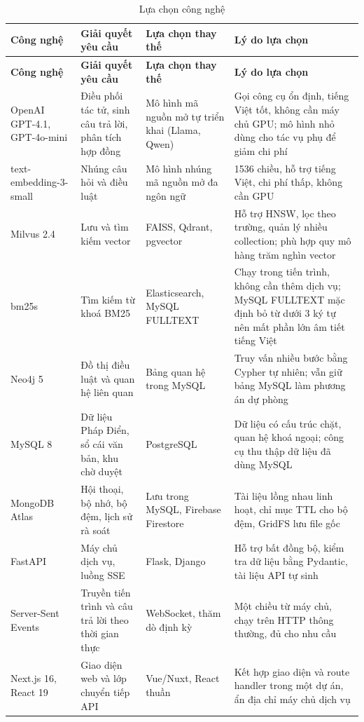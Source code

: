 \documentclass[../DoAn.tex]{subfiles}
\begin{document}
\begin{longtable}{|L{2.3cm}|L{3.1cm}|L{3.0cm}|L{4.9cm}|}
\caption{Lựa chọn công nghệ}\label{tab:congnghe}\\
\hline
\textbf{Công nghệ} & \textbf{Giải quyết yêu cầu} & \textbf{Lựa chọn thay thế} & \textbf{Lý do lựa chọn} \\ \hline
\endfirsthead
\hline
\textbf{Công nghệ} & \textbf{Giải quyết yêu cầu} & \textbf{Lựa chọn thay thế} & \textbf{Lý do lựa chọn} \\ \hline
\endhead
OpenAI GPT-4.1, GPT-4o-mini & Điều phối tác tử, sinh câu trả lời, phân tích hợp đồng & Mô hình mã nguồn mở tự triển khai (Llama, Qwen) & Gọi công cụ ổn định, tiếng Việt tốt, không cần máy chủ GPU; mô hình nhỏ dùng cho tác vụ phụ để giảm chi phí \\ \hline
text-embedding-3-small & Nhúng câu hỏi và điều luật & Mô hình nhúng mã nguồn mở đa ngôn ngữ & 1536 chiều, hỗ trợ tiếng Việt, chi phí thấp, không cần GPU \\ \hline
Milvus 2.4 & Lưu và tìm kiếm vector & FAISS, Qdrant, pgvector & Hỗ trợ HNSW, lọc theo trường, quản lý nhiều collection; phù hợp quy mô hàng trăm nghìn vector \cite{wang2021milvus} \\ \hline
bm25s & Tìm kiếm từ khoá BM25 & Elasticsearch, MySQL FULLTEXT & Chạy trong tiến trình, không cần thêm dịch vụ; MySQL FULLTEXT mặc định bỏ từ dưới 3 ký tự nên mất phần lớn âm tiết tiếng Việt \\ \hline
Neo4j 5 & Đồ thị điều luật và quan hệ liên quan & Bảng quan hệ trong MySQL & Truy vấn nhiều bước bằng Cypher \cite{neo4jdocs} tự nhiên; vẫn giữ bảng MySQL làm phương án dự phòng \\ \hline
MySQL 8 & Dữ liệu Pháp Điển, sổ cái văn bản, khu chờ duyệt & PostgreSQL & Dữ liệu có cấu trúc chặt, quan hệ khoá ngoại; công cụ thu thập dữ liệu đã dùng MySQL \\ \hline
MongoDB Atlas & Hội thoại, bộ nhớ, bộ đệm, lịch sử rà soát & Lưu trong MySQL, Firebase Firestore & Tài liệu lồng nhau linh hoạt, chỉ mục TTL cho bộ đệm, GridFS lưu file gốc \\ \hline
FastAPI & Máy chủ dịch vụ, luồng SSE & Flask, Django & Hỗ trợ bất đồng bộ, kiểm tra dữ liệu bằng Pydantic, tài liệu API tự sinh \cite{fastapidocs} \\ \hline
Server-Sent Events & Truyền tiến trình và câu trả lời theo thời gian thực & WebSocket, thăm dò định kỳ & Một chiều từ máy chủ, chạy trên HTTP thông thường, đủ cho nhu cầu \cite{whatwgsse} \\ \hline
Next.js 16, React 19 & Giao diện web và lớp chuyển tiếp API & Vue/Nuxt, React thuần & Kết hợp giao diện và route handler trong một dự án, ẩn địa chỉ máy chủ dịch vụ \cite{nextjsdocs} \\ \hline

\end{longtable}
\end{document}

